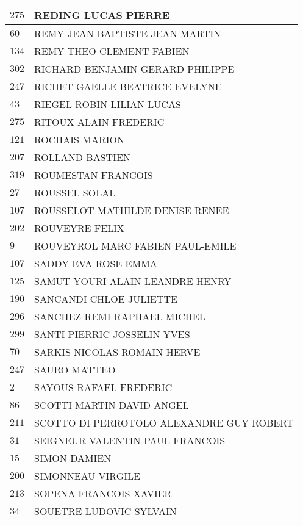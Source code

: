 \begin{xltabular}{\linewidth}{|l|X|}
    $275$ & REDING LUCAS PIERRE \\
    \hline
    $60$ & REMY JEAN-BAPTISTE JEAN-MARTIN \\
    \hline
    $134$ & REMY THEO CLEMENT FABIEN \\
    \hline
    $302$ & RICHARD BENJAMIN GERARD PHILIPPE \\
    \hline
    $247$ & RICHET GAELLE BEATRICE EVELYNE \\
    \hline
    $43$ & RIEGEL ROBIN LILIAN LUCAS \\
    \hline
    $275$ & RITOUX ALAIN FREDERIC \\
    \hline
    $121$ & ROCHAIS MARION \\
    \hline
    $207$ & ROLLAND BASTIEN \\
    \hline
    $319$ & ROUMESTAN FRANCOIS \\
    \hline
    $27$ & ROUSSEL SOLAL \\
    \hline
    $107$ & ROUSSELOT MATHILDE DENISE RENEE \\
    \hline
    $202$ & ROUVEYRE FELIX \\
    \hline
    $9$ & ROUVEYROL MARC FABIEN PAUL-EMILE \\
    \hline
    $107$ & SADDY EVA ROSE EMMA \\
    \hline
    $125$ & SAMUT YOURI ALAIN LEANDRE HENRY \\
    \hline
    $190$ & SANCANDI CHLOE JULIETTE \\
    \hline
    $296$ & SANCHEZ REMI RAPHAEL MICHEL \\
    \hline
    $299$ & SANTI PIERRIC JOSSELIN YVES \\
    \hline
    $70$ & SARKIS NICOLAS ROMAIN HERVE \\
    \hline
    $247$ & SAURO MATTEO \\
    \hline
    $2$ & SAYOUS RAFAEL FREDERIC \\
    \hline
    $86$ & SCOTTI MARTIN DAVID ANGEL \\
    \hline
    $211$ & SCOTTO DI PERROTOLO ALEXANDRE GUY ROBERT \\
    \hline
    $31$ & SEIGNEUR VALENTIN PAUL FRANCOIS \\
    \hline
    $15$ & SIMON DAMIEN \\
    \hline
    $200$ & SIMONNEAU VIRGILE \\
    \hline
    $213$ & SOPENA FRANCOIS-XAVIER \\
    \hline
    $34$ & SOUETRE LUDOVIC SYLVAIN \\
    \hline

\end{xltabular}
